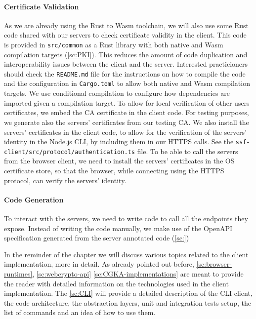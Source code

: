 \paragraph{Certificate Validation}
As we are already using the Rust to Wasm toolchain, 
we will also use some Rust code shared
with our servers to check certificate validity in the client.
This code is provided in \texttt{src/common} as a Rust library
with both native and Wasm compilation targets (\cref{sc:PKI}).
This reduces the amount of code duplication and interoperability
issues between the client and the server. Interested practicioners
should check the \texttt{README.md} file for the
instructions on how to compile the code and the configuration
in \texttt{Cargo.toml} to allow both native and Wasm compilation
targets. We use conditional
compilation to configure how dependencies are imported
given a compilation target. To allow for local verification
of other users certificates,
we embed the CA certificate in the client code.
For testing purposes, we generate also the servers' certificates
from our testing CA.
We also install the servers' certificates in the client code,
to allow for the verification of the servers' identity
in the Node.js CLI, by including them in our HTTPS calls.
See the \texttt{ssf-client/src/protocol/authentication.ts} file.
To be able to call the servers from the browser client,
we need to install the servers' certificates in the OS
certificate store, so that the browser, while connecting 
using the HTTPS protocol, can verify the servers' identity.

\paragraph{Code Generation}
To interact with the servers, we need to write code to
call all the endpoints they expose.
Instead of writing the code manually, we make use of the OpenAPI
specification generated from the server annotated code (\cref{sc:})

In the reminder of the chapter we will discuss various topics
related to the client implementation, more in detail.
As already pointed out before, \cref{sc:browser-runtimes}, \cref{sc:webcrypto-api} \cref{sc:CGKA-implementations}
are meant to provide the reader with detailed information 
on the technologies used in the client implementation.
The \cref{sc:CLI} will provide a detailed description of the CLI client,
the code architecture, the abstraction layers, unit and
integration tests setup, the list of commands and an idea of how
to use them.

